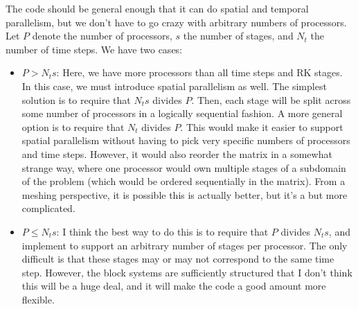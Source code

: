 \documentclass[a4paper,10pt]{article}
\begin{document}
The code should be general enough that it can do spatial and temporal parallelism, but we don't have to go crazy with
arbitrary numbers of processors. Let $P$ denote the number of processors, $s$ the number of stages, and 
$N_t$ the number of time steps. We have two cases:
%
\begin{itemize}
\item $P > N_ts$: Here, we have more processors than all time steps and RK stages. In this case, we must introduce
spatial parallelism as well. The simplest solution is to require that $N_ts$ divides $P$. Then, each stage will be split
across some number of processors in a logically sequential fashion. A more general option is to require that $N_t$
divides $P$. This would make it easier to support spatial parallelism without having to pick very specific numbers of
processors and time steps. However, it would also reorder the matrix in a somewhat strange way, where one processor
would own multiple stages of a subdomain of the problem (which would be ordered sequentially in the matrix). From a
meshing perspective, it is possible this is actually better, but it's a but more complicated.

\item $P \leq N_ts$: I think the best way to do this is to require that $P$ divides $N_ts$, and implement to support
an arbitrary number of stages per processor. The only difficult is that these stages may or may not correspond to
the same time step. However, the block systems are sufficiently structured that I don't think this will be a huge deal,
and it will make the code a good amount more flexible. 
\end{itemize}
\end{document}
